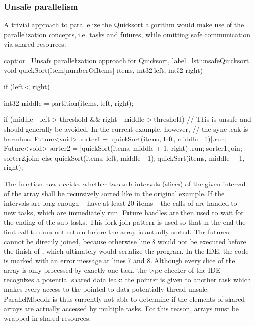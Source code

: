 \subsubsection{Unsafe parallelism}
A trivial approach to parallelize the Quicksort algorithm would make use of the parallelization concepts, i.e. tasks and futures, while omitting safe communication via shared resources:
\begin{ccode}{caption=Unsafe parallelization approach for Quicksort, label=lst:unsafeQuicksort}
void quickSort(Item[numberOfItems] items, int32 left, int32 right) { 
  if (left < right) { 
    int32 middle = partition(items, left, right); 
     
    if (middle - left > threshold && right - middle > threshold) { 
      // This is unsafe and should generally be avoided. In the current example, however, 
      // the sync leak is harmless. 
      Future<void> sorter1 = |quickSort(items, left, middle - 1)|.run; 
      Future<void> sorter2 = |quickSort(items, middle + 1, right)|.run; 
      sorter1.join; 
      sorter2.join; 
    } else { 
      quickSort(items, left, middle - 1); 
      quickSort(items, middle + 1, right); 
    }
  } 
}
\end{ccode}
The function now decides whether two sub-intervals (slices) of the given interval of the array shall be recursively sorted like in the original example. If the intervals are long enough -- have at least 20 items -- the calls of  are handed to new tasks, which are immediately run. Future handles are then used to wait for the ending of the sub-tasks. This fork-join pattern is used so that in the end the first call to  does not return before the array is actually sorted. The futures cannot be directly joined, because otherwise line 8 would not be executed before the finish of , which ultimately would serialize the program. In the IDE, the code is marked with an error message at lines 7 and 8. Although every slice of the array is only processed by exactly one task, the type checker of the IDE recognizes a potential shared data leak: the pointer  is given to another task which makes every access to the pointed-to data potentially thread-unsafe. ParallelMbeddr is thus currently not able to determine if the elements of shared arrays are actually accessed by multiple tasks. For this reason, arrays must be wrapped in shared resources.

